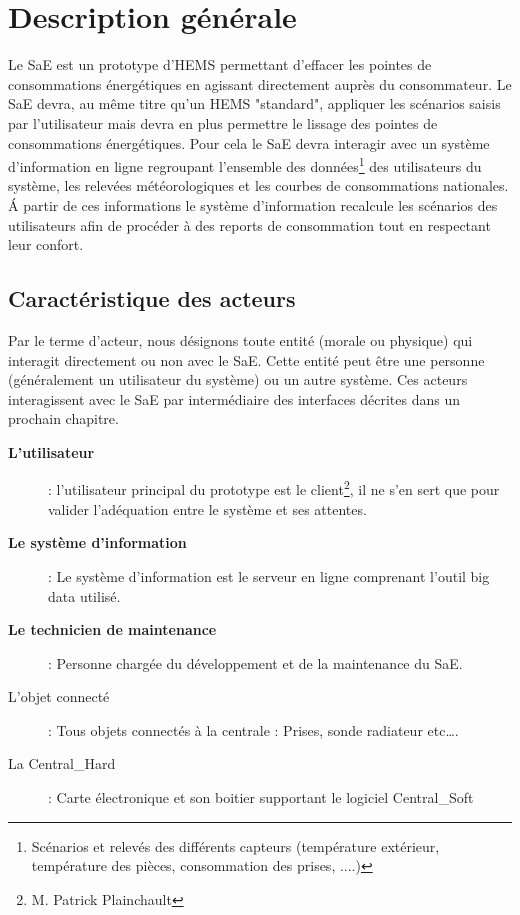 \documentclass[10pt,a4paper]{report}
\begin{document}
	\chapter{Description générale}
	
Le SaE est un prototype d'HEMS permettant d'effacer les pointes de consommations énergétiques en agissant directement auprès du consommateur. Le SaE devra, au même titre qu'un HEMS "standard", appliquer les scénarios saisis par l'utilisateur mais devra en plus permettre le lissage des pointes de consommations énergétiques.
Pour cela le SaE devra interagir avec un système d'information en ligne regroupant l'ensemble des données\footnote{Scénarios et relevés des différents capteurs (température extérieur, température des pièces, consommation des prises, ....)} des utilisateurs du système, les relevées météorologiques et les courbes de consommations nationales. \'A partir de ces informations le système d'information recalcule les scénarios des utilisateurs afin de procéder à des reports de consommation tout en respectant leur confort. %

		\section{Caractéristique des acteurs}
	
Par le terme d’acteur, nous désignons toute entité (morale ou physique) qui interagit directement ou non avec le SaE. Cette entité peut être une personne (généralement un utilisateur du système) ou un autre système. Ces acteurs interagissent avec le SaE par intermédiaire des interfaces décrites dans un prochain chapitre.

\begin{description}
	\item[\textbf{L'utilisateur}]: l'utilisateur principal du prototype est le client\footnote{M. Patrick Plainchault}, il ne s’en sert que pour valider l'adéquation entre le système et ses attentes. 
	\item[\textbf{Le système d'information}]: Le système d'information est le serveur en ligne comprenant l’outil big data utilisé.
	\item[\textbf{Le technicien de maintenance}]: Personne chargée du développement et de la maintenance du SaE.
	\item[L'objet connecté]: Tous objets connectés à la centrale : Prises, sonde radiateur etc….
	\item[La Central\_Hard]: Carte électronique et son boitier supportant le logiciel Central\_Soft
\end{description}
\end{document}

